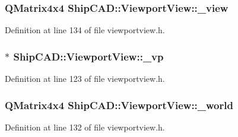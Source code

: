 \subsubsection[{\texorpdfstring{\+\_\+view}{_view}}]{\setlength{\rightskip}{0pt plus 5cm}Q\+Matrix4x4 Ship\+C\+A\+D\+::\+Viewport\+View\+::\+\_\+view\hspace{0.3cm}{\ttfamily [protected]}}\hypertarget{classShipCAD_1_1ViewportView_a56588119357f01d0764219252695e9c5}{}\label{classShipCAD_1_1ViewportView_a56588119357f01d0764219252695e9c5}


Definition at line 134 of file viewportview.\+h.

\subsubsection[{\texorpdfstring{\+\_\+vp}{_vp}}]{$\ast$ Ship\+C\+A\+D\+::\+Viewport\+View\+::\+\_\+vp\hspace{0.3cm}{\ttfamily [protected]}}\hypertarget{classShipCAD_1_1ViewportView_a9d980ea46c1638d05221dc71e666da04}{}\label{classShipCAD_1_1ViewportView_a9d980ea46c1638d05221dc71e666da04}


Definition at line 123 of file viewportview.\+h.

\subsubsection[{\texorpdfstring{\+\_\+world}{_world}}]{\setlength{\rightskip}{0pt plus 5cm}Q\+Matrix4x4 Ship\+C\+A\+D\+::\+Viewport\+View\+::\+\_\+world\hspace{0.3cm}{\ttfamily [protected]}}\hypertarget{classShipCAD_1_1ViewportView_a1b2d9753e22af2e9a071e60799478905}{}\label{classShipCAD_1_1ViewportView_a1b2d9753e22af2e9a071e60799478905}


Definition at line 132 of file viewportview.\+h.

